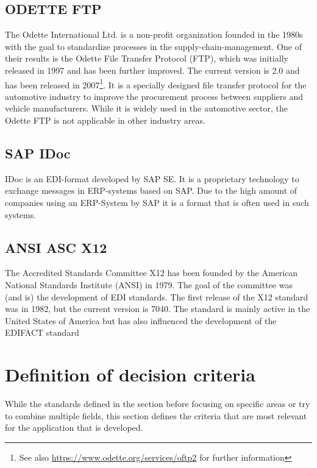 \subsection{ODETTE FTP}
\label{sec2.1.5}

The Odette International Ltd. is a non-profit organization founded in the 1980s with the goal to standardize processes in the supply-chain-management. One of their results is the Odette File Transfer Protocol (FTP), which was initially released in 1997 and has been further improved. The current version is 2.0 and has been released in 2007\footnote{See also \url{https://www.odette.org/services/oftp2} for further information}. It is a specially designed file transfer protocol for the automotive industry to improve the procurement process between suppliers and vehicle manufacturers. While it is widely used in the automotive sector, the Odette FTP is not applicable in other industry areas.

\subsection{SAP IDoc}
\label{sec2.1.6}

IDoc is an EDI-format developed by SAP SE. It is a proprietary technology to exchange messages in ERP-systems based on SAP. Due to the high amount of companies using an ERP-System by SAP it is a format that is often used in such systems.

\subsection{ANSI ASC X12}
\label{sec2.1.7}

The Accredited Standards Committee X12 has been founded by the American National Standards Institute (ANSI) in 1979. The goal of the committee was (and is) the development of EDI standards. The first release of the X12 standard was in 1982, but the current version is 7040. The standard is mainly active in the United States of America but has also influenced the development of the EDIFACT standard

\section{Definition of decision criteria}
\label{sec2.2}

While the standards defined in the section before focusing on specific areas or try to combine multiple fields, this section defines the criteria that are most relevant for the application that is developed.


